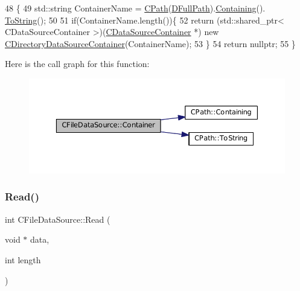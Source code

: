 \begin{DoxyCode}
48                                                                 \{
49     std::string ContainerName = \hyperlink{classCPath}{CPath}(\hyperlink{classCFileDataSource_acf4e0d3f7c32cae09f91b7530e490aea}{DFullPath}).\hyperlink{classCPath_a24d8c455b1663ce251d3a749437fa4fe}{Containing}().
      \hyperlink{classCPath_abbafaf377a7e38e0151bd9567d526951}{ToString}();
50     
51     \textcolor{keywordflow}{if}(ContainerName.length())\{
52         \textcolor{keywordflow}{return} (std::shared\_ptr< CDataSourceContainer >)(\hyperlink{classCDataSourceContainer}{CDataSourceContainer} *) \textcolor{keyword}{new} 
      \hyperlink{classCDirectoryDataSourceContainer}{CDirectoryDataSourceContainer}(ContainerName);
53     \}
54     \textcolor{keywordflow}{return} \textcolor{keyword}{nullptr};
55 \}
\end{DoxyCode}
Here is the call graph for this function\+:
\nopagebreak
\begin{figure}[H]
\begin{center}
\leavevmode
\includegraphics[width=350pt]{classCFileDataSource_a2492b88ea8186c4cbd4bdfa92060f5fa_cgraph}
\end{center}
\end{figure}
\hypertarget{classCFileDataSource_a97b9c7b8904aecbe7b0e8797508265fd}{}\label{classCFileDataSource_a97b9c7b8904aecbe7b0e8797508265fd} 
\subsubsection{\texorpdfstring{Read()}{Read()}}
{\footnotesize\ttfamily int C\+File\+Data\+Source\+::\+Read (\begin{DoxyParamCaption}\item[{void $\ast$}]{data,  }\item[{int}]{length }\end{DoxyParamCaption})\hspace{0.3cm}{\ttfamily [virtual]}}



